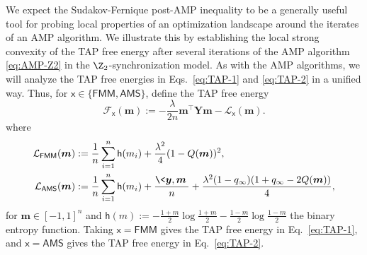 \documentclass[]{article}
\def\cL{{\mathcal L}}
\def\sx{{\mathsf x}}
\def\by{{\boldsymbol y}}
\def\cF{{\mathcal F}}
\def\by{{\boldsymbol y}}
\def\cF{{\mathcal F}}
\def\bY{{\boldsymbol Y}}
\def\bbm{{\boldsymbol m}}
\def\sh{{\mathsf h}}
\def\FMM{\mathsf{FMM}}
\def\AMS{\mathsf{AMS}}
\begin{document}
We expect the Sudakov-Fernique post-AMP inequality to be a generally useful tool for probing local properties of an optimization landscape around the iterates of an AMP algorithm.
We illustrate this by establishing the local strong convexity of the TAP free energy after several iterations of the AMP algorithm \eqref{eq:AMP-Z2} in the $\Z_2$-synchronization model.
As with the AMP algorithms, we will analyze the TAP free energies in Eqs.~\eqref{eq:TAP-1} and \eqref{eq:TAP-2} in a unified way.
Thus,
for $\sx \in \{ \FMM, \AMS \}$, 
define the TAP free energy
\begin{equation}
    \cF_{\sx}(\bbm) 
        := 
        -\frac{\lambda}{2n} \bbm^\top\bY\bbm
        -\cL_{\sx}(\bbm).
\end{equation} 
where
\begin{equation}
\begin{aligned}
    \cL_{\FMM}(\bbm)
        &:= 
        \frac1n \sum_{i=1}^n \sh(m_i) 
        +\frac{\lambda^2}4(1 - Q(\bbm))^2,
    \\
    \cL_{\AMS}(\bbm)
        &:= 
        \frac1n \sum_{i=1}^n \sh(m_i) 
        +
        \frac{\< \by , \bbm\>}{n}
        +
        \frac{\lambda^2(1-q_\infty)(1+q_\infty-2Q(\bbm))}4,
\end{aligned}
\end{equation}
for $\bbm \in [-1,1]^n$ and $\sh(m) := -\frac{1+m}{2}\log\frac{1+m}{2} - \frac{1-m}2 \log\frac{1-m}2$ the binary entropy function.
Taking $\sx = \FMM$ gives the TAP free energy in Eq.~\eqref{eq:TAP-1},
and $\sx = \AMS$ gives the TAP free energy in Eq.~\eqref{eq:TAP-2}.
\end{document}
